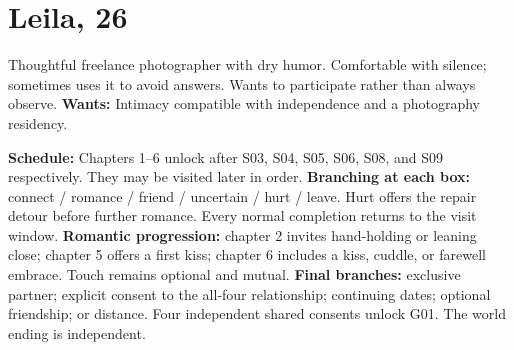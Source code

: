 \documentclass[11pt]{article}
\begin{document}
\section*{Leila, 26}
Thoughtful freelance photographer with dry humor. Comfortable with silence; sometimes uses it to avoid answers. Wants to participate rather than always observe.
\medskip
\textbf{Wants:} Intimacy compatible with independence and a photography residency.
\medskip
\begin{center}\end{center}
\textbf{Schedule:} Chapters 1--6 unlock after S03, S04, S05, S06, S08, and S09 respectively. They may be visited later in order.
\medskip
\textbf{Branching at each box:} connect / romance / friend / uncertain / hurt / leave. Hurt offers the repair detour before further romance. Every normal completion returns to the visit window.
\medskip
\textbf{Romantic progression:} chapter 2 invites hand-holding or leaning close; chapter 5 offers a first kiss; chapter 6 includes a kiss, cuddle, or farewell embrace. Touch remains optional and mutual.
\medskip
\textbf{Final branches:} exclusive partner; explicit consent to the all-four relationship; continuing dates; optional friendship; or distance. Four independent shared consents unlock G01. The world ending is independent.
\newpage
\end{document}
